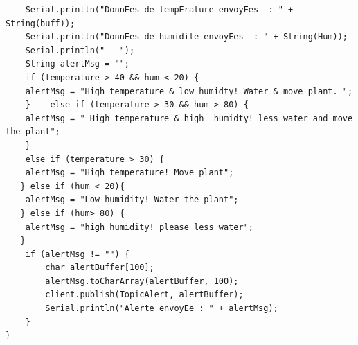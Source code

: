\documentclass[12pt,a4paper,oneside,english]{book}
\begin{document}
\begin{appendix}
\begin{lstlisting}
    Serial.println("DonnEes de tempErature envoyEes  : " + String(buff));
    Serial.println("DonnEes de humidite envoyEes  : " + String(Hum));
    Serial.println("---");
    String alertMsg = "";
    if (temperature > 40 && hum < 20) {
    alertMsg = "High temperature & low humidty! Water & move plant. ";
    }    else if (temperature > 30 && hum > 80) {
    alertMsg = " High temperature & high  humidty! less water and move the plant";
    }
    else if (temperature > 30) {
    alertMsg = "High temperature! Move plant";
   } else if (hum < 20){
    alertMsg = "Low humidity! Water the plant";
   } else if (hum> 80) {
    alertMsg = "high humidity! please less water";
   }
    if (alertMsg != "") {
        char alertBuffer[100];
        alertMsg.toCharArray(alertBuffer, 100);
        client.publish(TopicAlert, alertBuffer);
        Serial.println("Alerte envoyEe : " + alertMsg);
    }
}
\end{lstlisting}
\end{appendix}
\end{document}
